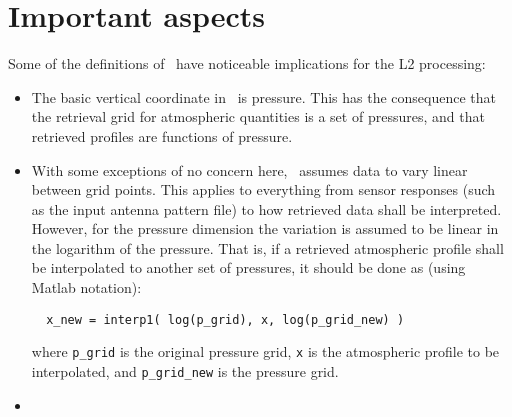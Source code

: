 \section{Important aspects}
\label{sec:arts:aspects}
%
Some of the definitions of \ARTS\ have noticeable implications for the
L2 processing:
\begin{itemize}
\item The basic vertical coordinate in \ARTS\ is pressure. This has the
  consequence that the retrieval grid for atmospheric quantities is a set of
  pressures, and that retrieved profiles are functions of pressure.
\item With some exceptions of no concern here, \ARTS\ assumes data to vary
  linear between grid points. This applies to everything from sensor responses
  (such as the input antenna pattern file) to how retrieved data shall be
  interpreted. However, for the pressure dimension the variation is assumed to
  be linear in the logarithm of the pressure. That is, if a retrieved
  atmospheric profile shall be interpolated to another set of pressures, it
  should be done as (using Matlab notation):
\begin{verbatim}
  x_new = interp1( log(p_grid), x, log(p_grid_new) )
\end{verbatim}
where \verb|p_grid| is the original pressure grid, \verb|x| is the atmospheric
profile to be interpolated, and \verb|p_grid_new| is the pressure grid.
\item {}
\end{itemize}




